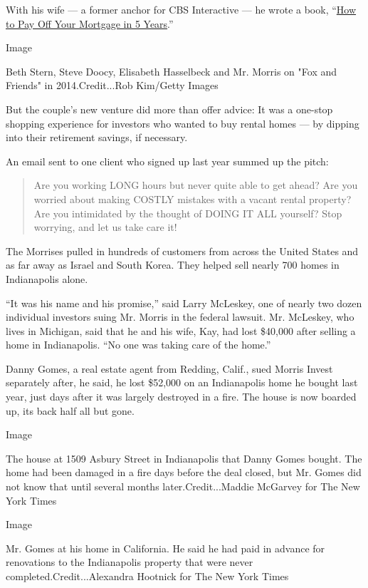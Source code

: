 With his wife --- a former anchor for CBS Interactive --- he wrote a
book,
``\href{https://www.amazon.com/gp/product/B07FVXN4PF/ref=dbs_a_def_rwt_hsch_vapi_taft_p1_i1}{How
to Pay Off Your Mortgage in 5 Years}.''

Image

Beth Stern, Steve Doocy, Elisabeth Hasselbeck and Mr. Morris on "Fox and
Friends" in 2014.Credit...Rob Kim/Getty Images

But the couple's new venture did more than offer advice: It was a
one-stop shopping experience for investors who wanted to buy rental
homes --- by dipping into their retirement savings, if necessary.

An email sent to one client who signed up last year summed up the pitch:

\begin{quote}
Are you working LONG hours but never quite able to get ahead? Are you
worried about making COSTLY mistakes with a vacant rental property? Are
you intimidated by the thought of DOING IT ALL yourself? Stop worrying,
and let us take care it!
\end{quote}

The Morrises pulled in hundreds of customers from across the United
States and as far away as Israel and South Korea. They helped sell
nearly 700 homes in Indianapolis alone.

``It was his name and his promise,'' said Larry McLeskey, one of nearly
two dozen individual investors suing Mr. Morris in the federal lawsuit.
Mr. McLeskey, who lives in Michigan, said that he and his wife, Kay, had
lost \$40,000 after selling a home in Indianapolis. ``No one was taking
care of the home.''

Danny Gomes, a real estate agent from Redding, Calif., sued Morris
Invest separately after, he said, he lost \$52,000 on an Indianapolis
home he bought last year, just days after it was largely destroyed in a
fire. The house is now boarded up, its back half all but gone.

Image

The house at 1509 Asbury Street in Indianapolis that Danny Gomes bought.
The home had been damaged in a fire days before the deal closed, but Mr.
Gomes did not know that until several months later.Credit...Maddie
McGarvey for The New York Times

Image

Mr. Gomes at his home in California. He said he had paid in advance for
renovations to the Indianapolis property that were never
completed.Credit...Alexandra Hootnick for The New York Times

